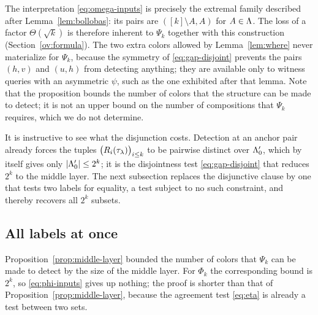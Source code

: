 The interpretation \eqref{eq:omega-inputs} is precisely the extremal family
described after Lemma~\ref{lem:bollobas}: its pairs are
$([k]\setminus A,A)$ for $A\in\Lambda$. The loss of a factor $\Theta(\sqrt k)$
is therefore inherent to $\Psi_k$ together with this construction
(Section~\ref{ov:formula}). The two extra colors allowed by
Lemma~\ref{lem:where} never materialize for $\Psi_k$, because the symmetry
of \eqref{eq:gap-disjoint} prevents the pairs $(h,v)$ and $(u,h)$ from
detecting anything; they are available only to witness queries with an
asymmetric $\psi$, such as the one exhibited after that lemma. Note that
the proposition bounds the
number of colors that the structure can be made to detect; it is not an
upper bound on the number of compositions that $\Psi_k$ requires, which we
do not determine.

It is instructive to see what the disjunction costs. Detection at an anchor
pair already forces the tuples $\bigl(R_i(\tau_{\lambda})\bigr)_{i\le k}$ to
be pairwise distinct over $\Lambda_0'$, which by itself gives only
$|\Lambda_0'|\le2^k$; it is the disjointness test \eqref{eq:gap-disjoint} that
reduces $2^k$ to the middle layer. The next subsection replaces the
disjunctive clause by one that tests two labels for equality, a test subject
to no such constraint, and thereby recovers all $2^k$ subsets.

\subsection{All labels at once}\label{app:alllabels}
Proposition~\ref{prop:middle-layer} bounded the number of colors that
$\Psi_k$ can be made to detect by the size of the middle layer. For $\Phi_k$
the corresponding bound is $2^k$, so \eqref{eq:phi-inputs} gives up
nothing; the proof is shorter than that of
Proposition~\ref{prop:middle-layer}, because the agreement test
\eqref{eq:eta} is already a test between two sets.

